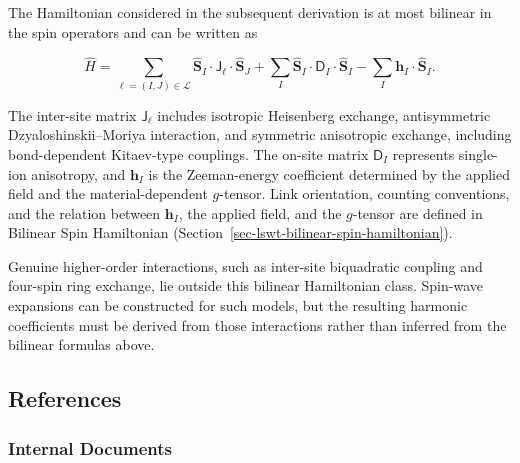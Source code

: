 The Hamiltonian considered in the subsequent derivation is at most bilinear in the spin operators and can be written as

\[
\hat H
=
\sum_{\ell=(I,J)\in\mathcal L}
\hat{\mathbf S}_I
\mathbin{\cdot}
\mathsf J_\ell
\mathbin{\cdot}
\hat{\mathbf S}_J
+
\sum_I
\hat{\mathbf S}_I
\mathbin{\cdot}
\mathsf D_I
\mathbin{\cdot}
\hat{\mathbf S}_I
-
\sum_I
\mathbf h_I
\mathbin{\cdot}
\hat{\mathbf S}_I.
\]

The inter-site matrix \(\mathsf J_\ell\) includes isotropic Heisenberg exchange, antisymmetric Dzyaloshinskii--Moriya interaction, and symmetric anisotropic exchange, including bond-dependent Kitaev-type couplings. The on-site matrix \(\mathsf D_I\) represents single-ion anisotropy, and \(\mathbf h_I\) is the Zeeman-energy coefficient determined by the applied field and the material-dependent \(g\)-tensor. Link orientation, counting conventions, and the relation between \(\mathbf h_I\), the applied field, and the \(g\)-tensor are defined in Bilinear Spin Hamiltonian (Section~\ref{sec-lswt-bilinear-spin-hamiltonian}).

Genuine higher-order interactions, such as inter-site biquadratic coupling and four-spin ring exchange, lie outside this bilinear Hamiltonian class. Spin-wave expansions can be constructed for such models, but the resulting harmonic coefficients must be derived from those interactions rather than inferred from the bilinear formulas above.

\subsection{References}

\subsubsection{Internal Documents}

